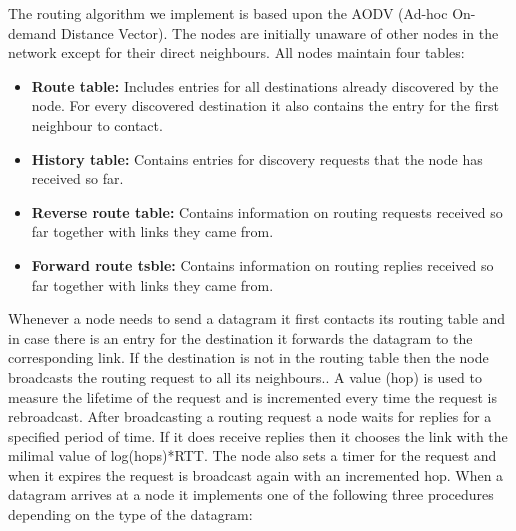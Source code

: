 \documentclass[11pt,a4paper,oneside]{report}
\begin{document}
The routing algorithm we implement is based upon the AODV (Ad-hoc On-demand
Distance Vector). The nodes are initially unaware of other nodes in the network except
for their direct neighbours. All nodes maintain four tables:
\begin{itemize}
\item \noindent \textbf{Route table:}
 Includes entries for
all destinations already discovered by the node.  For every discovered
destination it also contains the entry for the first neighbour to contact.
\item \noindent \textbf{History table:}
 Contains entries for discovery requests that the node has received so
far.
\item \noindent \textbf{Reverse route table:}
Contains information on routing requests received so far together with links they came from.
\item \noindent \textbf{Forward route tsble:}
Contains information on routing replies received so far together with links they came from.

\end{itemize}
Whenever a node needs to send a datagram it first contacts its
routing table and in case there is an entry for the destination it forwards the
datagram to the corresponding link. If the destination is not in the routing table
then the node broadcasts the routing request to all its neighbours.. A value (hop) is used to
measure the lifetime of the request and is incremented every time the request is
rebroadcast. After broadcasting a routing request a node waits for replies for
a specified period of time. If it does receive replies then it chooses the link with the
milimal value of log(hops)*RTT. The node also sets a timer for the request and when it expires the request
is broadcast again with an incremented hop. When a datagram arrives at a node it implements
one of the following three procedures depending on the type of the datagram:
\end{document}
